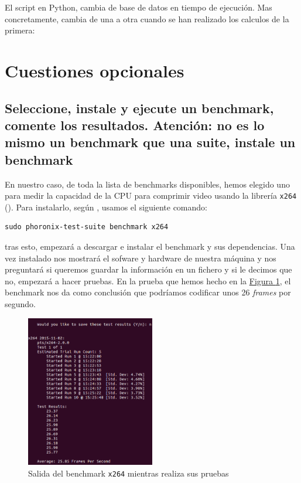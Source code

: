 \documentclass[10pt,a4paper,spanish]{article}
\numberwithin{equation}{section} %
\numberwithin{figure}{section} %
\numberwithin{table}{section} %
\begin{document}
El script en Python, cambia de base de datos en tiempo de ejecución. Mas concretamente, cambia de una a otra cuando se han realizado los calculos de la primera:


\section{Cuestiones opcionales}
\subsection{Seleccione, instale y ejecute un benchmark, comente los resultados. \textbf{Atención}: no es lo mismo un benchmark que una suite, instale un benchmark}
En nuestro caso, de toda la lista de benchmarks disponibles, hemos elegido uno para medir la capacidad de la CPU para comprimir video usando la librería \texttt{x264} (\cite{x264}). Para instalarlo, según \cite{phoronixubuntu}, usamos el siguiente comando:
\begin{verbatim}
sudo phoronix-test-suite benchmark x264
\end{verbatim}

tras esto, empezará a descargar e instalar el benchmark y sus dependencias. Una vez instalado nos mostrará el sofware y hardware de nuestra máquina y nos preguntará si queremos guardar la información en un fichero y si le decimos que no, empezará a hacer pruebas. En la prueba que hemos hecho en la \hyperref[x264test]{Figura \ref*{x264test}}, el benchmark nos da como conclusión que podríamos codificar unos 26 \textit{frames} por segundo. 

\begin{figure}[!h]
\centering
\includegraphics[width=0.5\textwidth]{3}
\caption{Salida del benchmark \texttt{x264} mientras realiza sus pruebas}
\label{x264test}
\end{figure}
\end{document}
